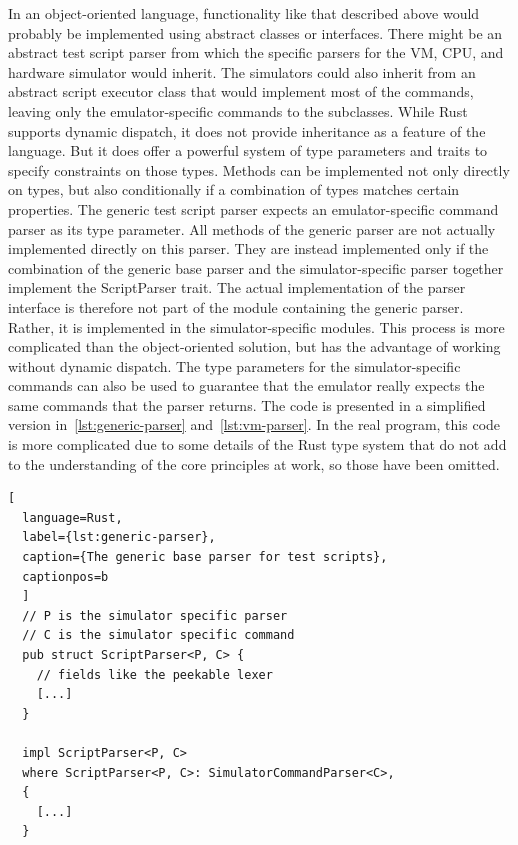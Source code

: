 In an object-oriented language, functionality like that described above would probably be implemented using abstract classes or interfaces.
There might be an abstract test script parser from which the specific parsers for the VM, CPU, and hardware simulator would inherit.
The simulators could also inherit from an abstract script executor class that would implement most of the commands, leaving only the emulator-specific commands to the subclasses.
While Rust supports dynamic dispatch, it does not provide inheritance as a feature of the language.
But it does offer a powerful system of type parameters and traits to specify constraints on those types.
Methods can be implemented not only directly on types, but also conditionally if a combination of types matches certain properties.
The generic test script parser expects an emulator-specific command parser as its type parameter.
All methods of the generic parser are not actually implemented directly on this parser.
They are instead implemented only if the combination of the generic base parser and the simulator-specific parser together implement the ScriptParser trait.
The actual implementation of the parser interface is therefore not part of the module containing the generic parser.
Rather, it is implemented in the simulator-specific modules.
This process is more complicated than the object-oriented solution, but has the advantage of working without dynamic dispatch.
The type parameters for the simulator-specific commands can also be used to guarantee that the emulator really expects the same commands that the parser returns.
The code is presented in a simplified version in~\cref{lst:generic-parser} and~\cref{lst:vm-parser}.
In the real program, this code is more complicated due to some details of the Rust type system that do not add to the understanding of the core principles at work, so those have been omitted.

\begin{lstlisting}[
  language=Rust,
  label={lst:generic-parser},
  caption={The generic base parser for test scripts},
  captionpos=b
  ]
  // P is the simulator specific parser
  // C is the simulator specific command
  pub struct ScriptParser<P, C> {
    // fields like the peekable lexer
    [...]
  }

  impl ScriptParser<P, C>
  where ScriptParser<P, C>: SimulatorCommandParser<C>,
  {
    [...]
  }
\end{lstlisting}

